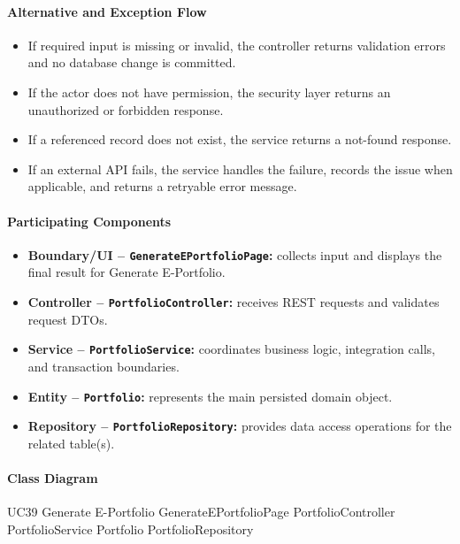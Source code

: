 \paragraph{Alternative and Exception Flow}

\begin{itemize}
    \item If required input is missing or invalid, the controller returns validation errors and no database change is committed.
    \item If the actor does not have permission, the security layer returns an unauthorized or forbidden response.
    \item If a referenced record does not exist, the service returns a not-found response.
    \item If an external API fails, the service handles the failure, records the issue when applicable, and returns a retryable error message.
\end{itemize}

\paragraph{Participating Components}

\begin{itemize}
    \item \textbf{Boundary/UI -- \texttt{GenerateEPortfolioPage}:} collects input and displays the final result for Generate E-Portfolio.
    \item \textbf{Controller -- \texttt{PortfolioController}:} receives REST requests and validates request DTOs.
    \item \textbf{Service -- \texttt{PortfolioService}:} coordinates business logic, integration calls, and transaction boundaries.
    \item \textbf{Entity -- \texttt{Portfolio}:} represents the main persisted domain object.
    \item \textbf{Repository -- \texttt{PortfolioRepository}:} provides data access operations for the related table(s).
\end{itemize}

\paragraph{Class Diagram}

\ClassDiagram
{UC39 Generate E-Portfolio}
{GenerateEPortfolioPage}
{PortfolioController}
{PortfolioService}
{Portfolio}
{PortfolioRepository}

